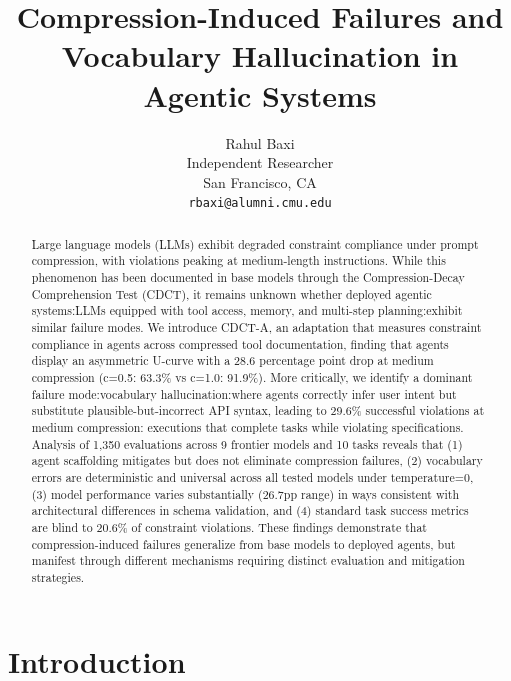 \documentclass[11pt]{article}
\begin{document}
\title{Compression-Induced Failures and Vocabulary Hallucination in Agentic Systems}

\author{Rahul Baxi \\
Independent Researcher \\
San Francisco, CA \\
\texttt{rbaxi@alumni.cmu.edu}}

\maketitle

\begin{abstract}
Large language models (LLMs) exhibit degraded constraint compliance under prompt compression, with violations peaking at medium-length instructions. While this phenomenon has been documented in base models through the Compression-Decay Comprehension Test (CDCT), it remains unknown whether deployed agentic systems:LLMs equipped with tool access, memory, and multi-step planning:exhibit similar failure modes. We introduce CDCT-A, an adaptation that measures constraint compliance in agents across compressed tool documentation, finding that agents display an asymmetric U-curve with a 28.6 percentage point drop at medium compression (c=0.5: 63.3\% vs c=1.0: 91.9\%). More critically, we identify a dominant failure mode:vocabulary hallucination:where agents correctly infer user intent but substitute plausible-but-incorrect API syntax, leading to 29.6\% successful violations at medium compression: executions that complete tasks while violating specifications. Analysis of 1,350 evaluations across 9 frontier models and 10 tasks reveals that (1) agent scaffolding mitigates but does not eliminate compression failures, (2) vocabulary errors are deterministic and universal across all tested models under temperature=0, (3) model performance varies substantially (26.7pp range) in ways consistent with architectural differences in schema validation, and (4) standard task success metrics are blind to 20.6\% of constraint violations. These findings demonstrate that compression-induced failures generalize from base models to deployed agents, but manifest through different mechanisms requiring distinct evaluation and mitigation strategies.
\end{abstract}

\section{Introduction}
\end{document}
